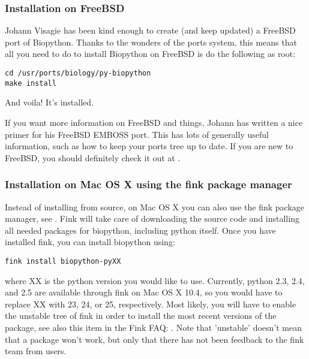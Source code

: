 \documentclass{article}
\begin{document}
\subsubsection{Installation on FreeBSD}

Johann Visagie has been kind enough to create (and keep updated) a FreeBSD port of Biopython. Thanks to the wonders of the ports system, this means that all you need to do to install Biopython on FreeBSD is do the following as root:

\begin{verbatim}
cd /usr/ports/biology/py-biopython
make install
\end{verbatim}

And voila! It's installed. 

If you want more information on FreeBSD and things, Johann has written a nice primer for his FreeBSD EMBOSS port. This has lots of generally useful information, such as how to keep your ports tree up to date. If you are new to FreeBSD, you should definitely check it out at .

\subsubsection{Installation on Mac OS X using the fink package manager}

Instead of installing from source, on Mac OS X you can also use the fink package manager, see . Fink will take care of downloading the source code and installing all needed packages for biopython, including python itself. Once you have installed fink, you can install biopython using:

\begin{verbatim}
fink install biopython-pyXX
\end{verbatim}

\noindent where XX is the python version you would like to use. Currently, python 2.3, 2.4, and 2.5 are available through fink on Mac OS X 10.4, so you would have to replace XX with 23, 24, or 25, respectively. Most likely, you will have to enable the unstable tree of fink in order to install the most recent versions of the package, see also this item in the Fink FAQ: . Note that 'unstable' doesn't mean that a package won't work, but only that there has not been feedback to the fink team from users.
\end{document}
